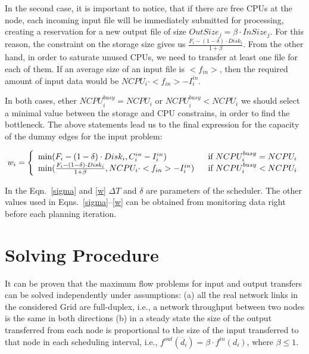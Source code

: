 \documentclass{svjour3}                     %
\begin{document}
In the second case, it is important to notice, that if there are free CPUs at the node, each incoming input file will be immediately submitted for processing, creating a reservation for a new output file of size  $OutSize_{j} = \beta \cdot InSize_{j}$. For this reason, the constraint on the storage size gives us $\frac{F_{i} -   (1 - \delta) \cdot Disk_{i}}{1 + \beta}$. From the other hand, in order to saturate unused CPUs, we need to transfer at least one file for each of them. If an average size of an input file is $<f_{in}>$, then the required amount of input data would be $NCPU_{i} \cdot <f_{in}> - I_{i}^{in}$. 

In both cases, ether $NCPU_{i}^{busy} = NCPU_{i}$ or $NCPU_{i}^{busy} < NCPU_{i}$ we should select a minimal value between the storage and CPU constrains, in order to find the bottleneck. The above statements lead us to the final expression for the capacity of the dummy edges for the input problem:

\begin{equation}
w_{i} =\left\{ 
\begin{array}{l l}
\min(F_{i} -  (1 - \delta) \cdot Disk_{i} , 
C_{i}^{in} - I_{i}^{in}) & \ \ \text{if }  NCPU_{i}^{busy} = NCPU_{i} \\
\min(\frac{F_{i} -   (1 - \delta) \cdot Disk_{i}}{1 + \beta},
NCPU_{i} \cdot <f_{in}> - I_{i}^{in}) & \ \ \text{if }  NCPU_{i}^{busy} < NCPU_{i}

 \end{array} \right.
\label{w}
\end{equation}

%

In the Eqn.~\ref{sigma} and \ref{w} $\Delta T$ and $\delta$ are parameters of the scheduler. The other values used in
Eqns.~\ref{sigma}--\ref{w} can be obtained from monitoring data right before each planning iteration.

\section{Solving Procedure}
\label{solve}
It can be proven that the maximum flow problems for input and output transfers
can be solved independently under assumptions: (a) all the real network links
in the considered Grid are full-duplex, i.e., a network throughput between two
nodes is the same in both directions (b) in a steady state the size of the
output transferred from each node is proportional to the size of the input
transferred to that node in each scheduling interval, i.e.,
$f^{out}(\overline{d}_{i})= \beta \cdot f^{in}(d_{i})$, where $\beta \leq 1$.
\end{document}
